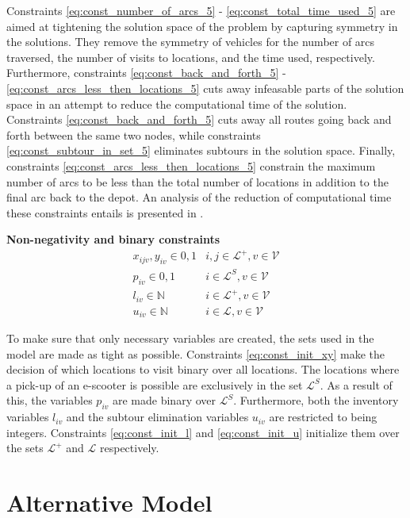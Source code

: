 Constraints \eqref{eq:const_number_of_arcs_5} - \eqref{eq:const_total_time_used_5} are aimed at tightening the solution space of the problem by capturing symmetry in the solutions. They remove the symmetry of vehicles for the number of arcs traversed, the number of visits to locations, and the time used, respectively. Furthermore, constraints \eqref{eq:const_back_and_forth_5} - \eqref{eq:const_arcs_less_then_locations_5} cuts away infeasable parts of the solution space in an attempt to reduce the computational time of the solution. Constraints \eqref{eq:const_back_and_forth_5} cuts away all routes going back and forth between the same two nodes, while constraints \eqref{eq:const_subtour_in_set_5} eliminates subtours in the solution space. Finally, constraints \eqref{eq:const_arcs_less_then_locations_5} constrain the maximum number of arcs to be less than the total number of locations in addition to the final arc back to the depot. An analysis of the reduction of computational time these constraints entails is presented in .

\textbf{Non-negativity and binary constraints}
\begin{eqnarray}
    x_{ijv}, y_{iv} \in {0, 1} &   i,j\in \mathcal{L}^{+}, v\in \mathcal{V}\label{eq:const_init_xy} \\
    p_{iv} \in {0, 1} &   i\in \mathcal{L}^{S}, v\in \mathcal{V}\label{eq:const_init_p} \\
    l_{iv} \in \mathbb{N} & i\in \mathcal{L}^{+}, v\in \mathcal{V}\label{eq:const_init_l} \\
    u_{iv} \in \mathbb{N} & i\in \mathcal{L}, v\in \mathcal{V}\label{eq:const_init_u}
\end{eqnarray}

To make sure that only necessary variables are created, the sets used in the model are made as tight as possible. Constraints \eqref{eq:const_init_xy} make the decision of which locations to visit binary over all locations. The locations where a pick-up of an e-scooter is possible are exclusively in the set $\mathcal{L}^{S}$. As a result of this, the variables $p_{iv}$ are made binary over $\mathcal{L}^{S}$. Furthermore, both the inventory variables $l_{iv}$ and the subtour elimination variables $u_{iv}$ are restricted to being integers. Constraints \eqref{eq:const_init_l} and \eqref{eq:const_init_u} initialize them over the sets $\mathcal{L}^{+}$ and $\mathcal{L}$ respectively. 

\section{Alternative Model}\label{alt_model}

